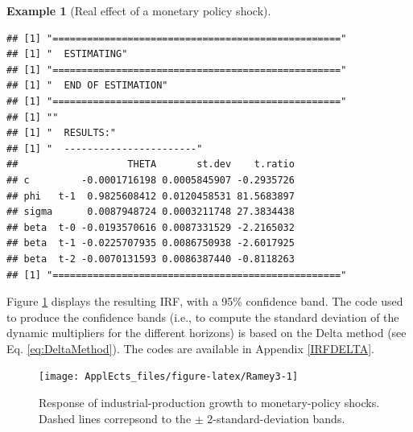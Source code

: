 \documentclass[
  12pt,
]{book}
\newenvironment{Shaded}{\begin{snugshade}}{\end{snugshade}}
\newcommand{\AttributeTok}[1]{\textcolor[rgb]{0.77,0.63,0.00}{#1}}
\newcommand{\CommentTok}[1]{\textcolor[rgb]{0.56,0.35,0.01}{\textit{#1}}}
\newcommand{\ConstantTok}[1]{\textcolor[rgb]{0.00,0.00,0.00}{#1}}
\newcommand{\DecValTok}[1]{\textcolor[rgb]{0.00,0.00,0.81}{#1}}
\newcommand{\FunctionTok}[1]{\textcolor[rgb]{0.00,0.00,0.00}{#1}}
\newcommand{\NormalTok}[1]{#1}
\newcommand{\OtherTok}[1]{\textcolor[rgb]{0.56,0.35,0.01}{#1}}
\newcommand{\SpecialCharTok}[1]{\textcolor[rgb]{0.00,0.00,0.00}{#1}}
\theoremstyle{definition}
\theoremstyle{definition}
\newtheorem{example}{Example}[chapter]
\theoremstyle{definition}
\theoremstyle{definition}
\theoremstyle{remark}
\begin{document}
\begin{example}[Real effect of a monetary policy shock]
\begin{Shaded}
\end{Shaded}

\begin{verbatim}
## [1] "=================================================="
## [1] "  ESTIMATING"
## [1] "=================================================="
## [1] "  END OF ESTIMATION"
## [1] "=================================================="
## [1] ""
## [1] "  RESULTS:"
## [1] "  -----------------------"
##                   THETA       st.dev    t.ratio
## c         -0.0001716198 0.0005845907 -0.2935726
## phi   t-1  0.9825608412 0.0120458531 81.5683897
## sigma      0.0087948724 0.0003211748 27.3834438
## beta  t-0 -0.0193570616 0.0087331529 -2.2165032
## beta  t-1 -0.0225707935 0.0086750938 -2.6017925
## beta  t-2 -0.0070131593 0.0086387440 -0.8118263
## [1] "=================================================="
\end{verbatim}

\begin{Shaded}
\end{Shaded}

Figure \ref{fig:Ramey3} displays the resulting IRF, with a 95\% confidence band. The code used to produce the confidence bands (i.e., to compute the standard deviation of the dynamic multipliers for the different horizons) is based on the Delta method (see Eq. \eqref{eq:DeltaMethod}). The codes are available in Appendix \ref{IRFDELTA}.

\begin{figure}
\texttt{[image: ApplEcts\_files/figure-latex/Ramey3-1]} \caption{Response of industrial-production growth to monetary-policy shocks. Dashed lines correpsond to the $\pm$  2-standard-deviation bands.}\label{fig:Ramey3}
\end{figure}

\end{example}
\end{document}
